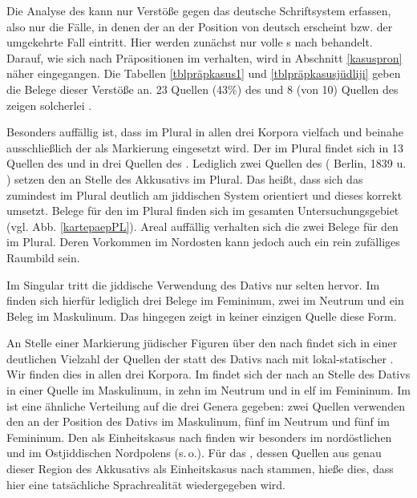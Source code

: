 Die Analyse des  kann nur Verstöße gegen das deutsche Schriftsystem erfassen, also nur die Fälle, in denen der  an der Position von deutsch  erscheint bzw. der umgekehrte Fall eintritt. Hier werden zunächst nur volle s nach  behandelt. Darauf, wie sich  nach Präpositionen im  verhalten, wird in Abschnitt \ref{kasuspron} näher eingegangen. Die Tabellen \ref{tblpräpkasus1} und \ref{tblpräpkasusjüdliji}  
geben die Belege dieser Verstöße an. 23 Quellen (43\%) des  und 8 (von 10) Quellen des  
zeigen solcherlei . 

Besonders auffällig ist, dass im Plural in allen drei Korpora vielfach und beinahe ausschließlich der  als Markierung eingesetzt wird. Der  im Plural findet sich in 13 Quellen des  und in drei Quellen des .  
Lediglich zwei Quellen des  ( Berlin, 1839 u. ) setzen den  an Stelle des Akkusativs im Plural. Das heißt, dass sich das  zumindest im Plural deutlich am jiddischen System orientiert und dieses korrekt umsetzt. Belege für den  im Plural finden sich im gesamten Untersuchungsgebiet (vgl. Abb. \ref{kartepaepPL}). Areal auffällig verhalten sich die zwei Belege für den  im Plural. Deren Vorkommen im Nordosten kann jedoch auch ein rein zufälliges Raumbild sein.

Im Singular tritt die jiddische Verwendung des Dativs nur selten hervor. Im  finden sich hierfür lediglich drei Belege im Femininum, zwei im Neutrum und ein Beleg im Maskulinum. Das  hingegen zeigt in keiner einzigen Quelle diese Form.

An Stelle einer Markierung jüdischer Figuren über den  nach  findet sich in einer deutlichen Vielzahl der Quellen der  statt des Dativs nach  mit lokal-statischer . Wir finden dies in allen drei Korpora. Im  findet sich der  nach  an Stelle des Dativs in einer Quelle im Maskulinum, in zehn im Neutrum und in elf im Femininum. Im  ist eine ähnliche Verteilung auf die drei Genera gegeben: zwei Quellen verwenden den  an der Position des Dativs im Maskulinum, fünf im Neutrum und fünf im Femininum. Den  als Einheitskasus nach  finden wir besonders im nordöstlichen  und im Ostjiddischen Nordpolens (s.\,o.). Für das , dessen Quellen aus genau dieser Region des Akkusativs als Einheitskasus nach  stammen, hieße dies, dass hier eine tatsächliche Sprachrealität wiedergegeben wird. 

